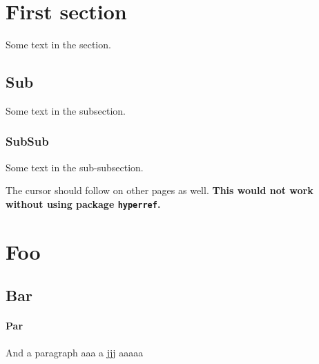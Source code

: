 \documentclass{article}
\begin{document}
\section {First section}

Some text in the section.  
 
\subsection {Sub}

Some text in the subsection. 

\subsubsection {SubSub} 

Some text in the sub-subsection. 

\newpage

The cursor should follow on other pages as well. 
\textbf{This would not work without 
using package \texttt{hyperref}.}



\section{Foo}

\subsection {Bar}

\paragraph {Par}

And a paragraph aaa a jjj aaaaa
\end{document}
